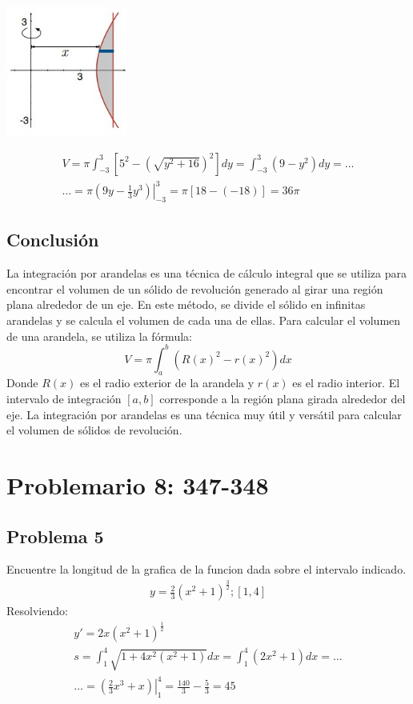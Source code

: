 \documentclass{article}
\begin{document}
\begin{center}
  \includegraphics[width=0.3\textwidth]{multimedia/photo_5030828484276103944_m.jpg}
\end{center}
\begin{align*}
  V=\pi\int_{-3}^{3}\left[5^2-\left(\sqrt{y^2+16}\right)^2\right]dy = \int_{-3}^{3}(9-y^2)dy = \dots \\ \dots = \pi\left.\left(9y-\frac{1}{3}y^3\right)\right|_{-3}^3 = \pi[18-(-18)] = 36\pi
\end{align*}
\subsection{Conclusión}
La integración por arandelas es una técnica de cálculo integral que se utiliza para encontrar el volumen de un sólido de revolución generado al girar una región plana alrededor de un eje. En este método, se divide el sólido en infinitas arandelas y se calcula el volumen de cada una de ellas.
Para calcular el volumen de una arandela, se utiliza la fórmula:
\newline
$$V = \pi \int_{a}^{b} (R(x)^2 - r(x)^2) dx$$
\newline
Donde $R(x)$ es el radio exterior de la arandela y $r(x)$ es el radio interior. El intervalo de integración $[a,b]$ corresponde a la región plana girada alrededor del eje.
\newline
La integración por arandelas es una técnica muy útil y versátil para calcular el volumen de sólidos de revolución.
\section{Problemario 8: 347-348}
\subsection{Problema 5}
Encuentre la longitud de la grafica de la funcion dada sobre el intervalo indicado.
\begin{align*}
  y = \frac{2}{3}(x^2+1)^{\frac{3}{2}}; [1,4]
\end{align*}
Resolviendo:
\begin{align*}
  y'=2x(x^2+1)^{\frac{1}{2}}\\ s =\int_{1}^{4}\sqrt{1+4x^2(x^2+1)}dx = \int_{1}^{4}(2x^2+1)dx = \dots \\ \dots = \left.\left(\frac{2}{3}x^3+x\right)\right|_1^4=\frac{140}{3}-\frac{5}{3} = 45
\end{align*}
\end{document}
